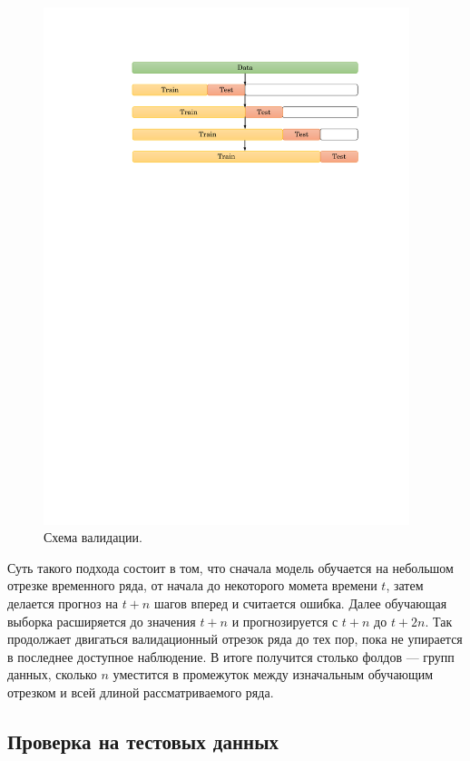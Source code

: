 \documentclass[14pt]{extarticle}
\begin{document}
\begin{figure}[h]
	\centering
	\includegraphics[width=0.95\textwidth]{img/sliding_window_val.pdf}
	\caption{Схема валидации.}
	\label{fig:sliding_window}
\end{figure}

Суть такого подхода состоит в том, что сначала модель обучается на небольшом отрезке временного ряда, от начала до некоторого момета времени $t$, затем делается прогноз на $t + n$  шагов вперед и считается ошибка. Далее обучающая выборка расширяется до  значения $t + n$ и прогнозируется с $t + n$ до $t + 2n$. Так продолжает двигаться валидационный отрезок ряда до тех пор, пока не упирается в последнее доступное наблюдение. В итоге получится столько фолдов --- групп данных, сколько $n$ уместится в промежуток между изначальным обучающим отрезком и всей длиной рассматриваемого ряда.

\subsection{Проверка на тестовых данных}
\end{document}
